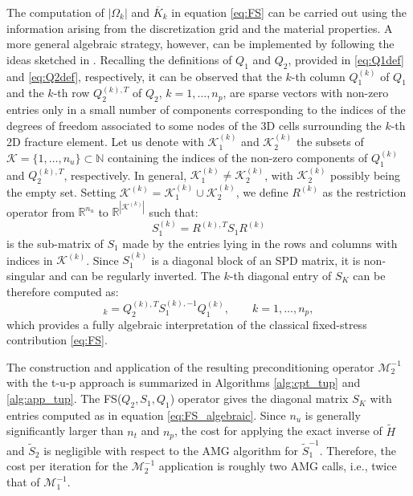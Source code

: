 \documentclass[3p,times]{elsarticle}
\theoremstyle{plain}
\newcommand{\tS}{\widetilde{S}}
\newcommand{\tH}{\widetilde{H}}
\begin{document}
\begin{rem}
\label{rem:FS}
The computation of $|\Omega_k|$ and $\overline{K}_k$ in equation \eqref{eq:FS} can be carried out using the information arising from the discretization grid and the material properties. A more general algebraic strategy, however, can be implemented by following the ideas sketched in \cite{caswhifer16}. Recalling the definitions of $Q_1$ and $Q_2$, provided in \eqref{eq:Q1def} and \eqref{eq:Q2def}, respectively, it can be observed that the $k$-th column $Q_1^{(k)}$ of $Q_1$ and the $k$-th row $Q_2^{(k),T}$ of $Q_2$, $k=1,\ldots,n_p$, are sparse vectors with non-zero entries only in a small number of components corresponding to the indices of the degrees of freedom associated to some nodes of the 3D cells surrounding the $k$-th 2D fracture element. Let us denote with $\mathcal{K}_1^{(k)}$ and $\mathcal{K}_2^{(k)}$ the subsets of $\mathcal{K}=\{1,\ldots,n_u\}\subset\mathbb{N}$ containing the indices of the non-zero components of $Q_1^{(k)}$ and $Q_2^{(k),T}$, respectively. In general, $\mathcal{K}_1^{(k)}\neq\mathcal{K}_2^{(k)}$, with $\mathcal{K}_2^{(k)}$ possibly being the empty set. Setting $\mathcal{K}^{(k)}=\mathcal{K}_1^{(k)}\cup\mathcal{K}_2^{(k)}$, we define $R^{(k)}$ as the restriction operator from $\mathbb{R}^{n_u}$ to $\mathbb{R}^{|\mathcal{K}^{(k)}|}$ such that:
\begin{equation}
    S_1^{(k)} = R^{(k),T} S_1 R^{(k)}
    \label{eq:Ak}
\end{equation}
is the sub-matrix of $S_1$ made by the entries lying in the rows and columns with indices in $\mathcal{K}^{(k)}$. Since $S_1^{(k)}$ is a diagonal block of an SPD matrix, it is non-singular and can be regularly inverted. The $k$-th diagonal entry of $S_K$ can be therefore computed as:
\begin{equation}
    [S_K]_k = Q_2^{(k),T} S_1^{(k),-1} Q_1^{(k)}, \qquad k=1,\ldots,n_p,
    \label{eq:FS_algebraic}
\end{equation}
which provides a fully algebraic interpretation of the classical fixed-stress contribution \eqref{eq:FS}.
\end{rem}

The construction and application of the resulting preconditioning operator $\mathcal{M}_2^{-1}$ with the t-u-p approach is summarized in Algorithms \ref{alg:cpt_tup} and \ref{alg:app_tup}. The FS($Q_2,S_1,Q_1$) operator gives the diagonal matrix $S_K$ with entries computed as in equation \eqref{eq:FS_algebraic}. Since $n_u$ is generally significantly larger than $n_t$ and $n_p$, the cost for applying the exact inverse of $\tH$ and $\tS_2$ is negligible with respect to the AMG algorithm for $\tS_1^{-1}$. Therefore, the cost per iteration for the $\mathcal{M}_2^{-1}$ application is roughly two AMG calls, i.e., twice that of $\mathcal{M}_1^{-1}$.
\end{document}
